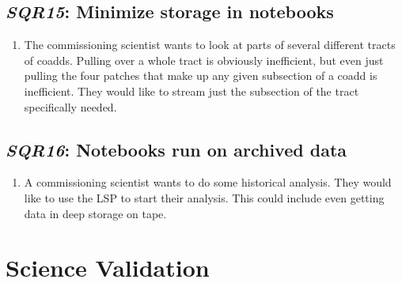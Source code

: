\documentclass[DM,toc,lsstdraft]{lsstdoc}
\newcommand{\usecase}[3]{%
\subsection{\emph{#1}: #2}
\label{use:#1}
\begin{enumerate}[label=\alph*.]
#3
\end{enumerate}
}
\begin{document}
\usecase{SQR15}{Minimize storage in notebooks}{%

\item
The commissioning scientist wants to look at parts of several different tracts of coadds.
Pulling over a whole tract is obviously inefficient, but even just pulling the four patches that make up any given subsection of a coadd is inefficient.
They would like to stream just the subsection of the tract specifically needed.

}

\usecase{SQR16}{Notebooks run on archived data}{%

\item
A commissioning scientist wants to do some historical analysis.
They would like to use the LSP to start their analysis.
This could include even getting data in deep storage on tape.

}

\section{Science Validation}
\end{document}
